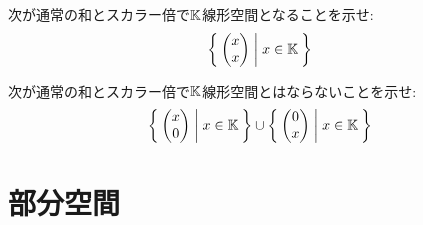 \begin{quiz}
  次が通常の和とスカラー倍で$\mathbb{K}$線形空間となることを示せ:
  \begin{align*}
    \Set{\begin{pmatrix}x\\x\end{pmatrix}|x\in\mathbb{K}}
  \end{align*}
\end{quiz}

\begin{quiz}
  次が通常の和とスカラー倍で$\mathbb{K}$線形空間とはならないことを示せ:
  \begin{align*}
    \Set{\begin{pmatrix}x\\0\end{pmatrix}|x\in\mathbb{K}}
    \cup \Set{\begin{pmatrix}0\\x\end{pmatrix}|x\in\mathbb{K}}
  \end{align*}
\end{quiz}

\chapter{部分空間}
\label{chap:subspace}
